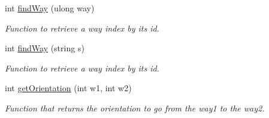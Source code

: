 \begin{DoxyCompactItemize}
int \hyperlink{classParser_a0b51b15e7a8b0193be93d75074d23b24}{find\+Way} (ulong way)
\begin{DoxyCompactList}\small\item\em Function to retrieve a way index by its id. \end{DoxyCompactList}\item 
int \hyperlink{classParser_aa3df51fa8a42dbacf0eef33290fa5735}{find\+Way} (string s)
\begin{DoxyCompactList}\small\item\em Function to retrieve a way index by its id. \end{DoxyCompactList}\item 
int \hyperlink{classParser_ae7b8729f987b4e453936a50c3a6fafde}{get\+Orientation} (int w1, int w2)
\begin{DoxyCompactList}\small\item\em Function that returns the orientation to go from the way1 to the way2. \end{DoxyCompactList}\end{DoxyCompactItemize}

